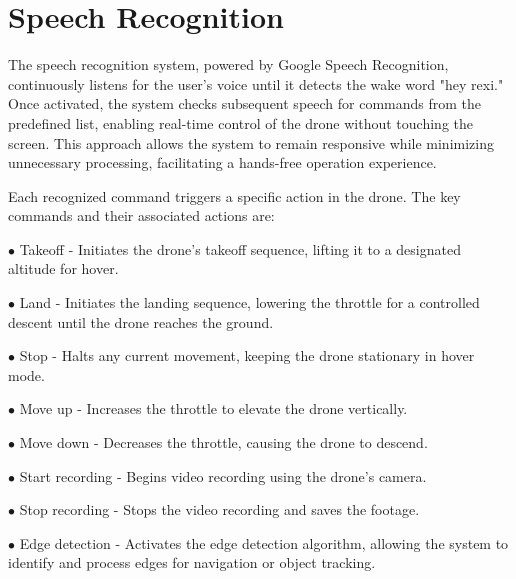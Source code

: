 \documentclass[3p,times]{elsarticle}
\begin{document}
\section{Speech Recognition} \label{sec:SpeechRecognition}
The speech recognition system, powered by Google Speech Recognition, continuously listens for the user’s voice until it detects the wake word "hey rexi." Once activated, the system checks subsequent speech for commands from the predefined list, enabling real-time control of the drone without touching the screen. This approach allows the system to remain responsive while minimizing unnecessary processing, facilitating a hands-free operation experience.

Each recognized command triggers a specific action in the drone. The key commands and their associated actions are:
\begin{description}
\item $\bullet$ Takeoff - Initiates the drone's takeoff sequence, lifting it to a designated altitude for hover.
\item $\bullet$ Land - Initiates the landing sequence, lowering the throttle for a controlled descent until the drone reaches the ground.
\item $\bullet$ Stop - Halts any current movement, keeping the drone stationary in hover mode.
\item $\bullet$ Move up - Increases the throttle to elevate the drone vertically.
\item $\bullet$ Move down - Decreases the throttle, causing the drone to descend.
\item $\bullet$ Start recording - Begins video recording using the drone's camera.
\item $\bullet$ Stop recording - Stops the video recording and saves the footage.
\item $\bullet$ Edge detection - Activates the edge detection algorithm, allowing the system to identify and process edges for navigation or object tracking.

\end{description}


\end{document}
